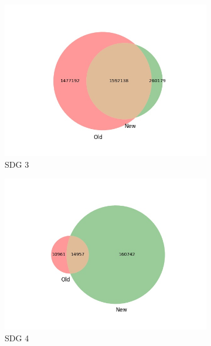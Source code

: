 \documentclass{article}
\begin{document}
\begin{figure}[H]
\begin{subfigure}{0.24\textwidth}
        \includegraphics[width=\textwidth]{figures/aurora-elsevier-venn/venn_sdg_3.jpg}
	    \caption{SDG 3}
    \end{subfigure}
    \hfill
    \begin{subfigure}{0.24\textwidth}
        \centering
        \includegraphics[width=\textwidth]{figures/aurora-elsevier-venn/venn_sdg_4.jpg}
	    \caption{SDG 4}
    \end{subfigure}
    \begin{subfigure}{0.24\textwidth}
        \centering

\end{subfigure}
\end{figure}
\end{document}

